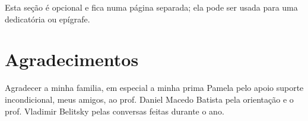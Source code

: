 

\begin{dedicatoria}
    Esta seção é opcional e fica numa página separada; ela pode ser usada para
    uma dedicatória ou epígrafe.
    \end{dedicatoria}
    
    
    \chapter*{Agradecimentos}
    
    Agradecer a minha familia, em especial a minha prima Pamela pelo apoio suporte incondicional, meus amigos, ao
   prof. Daniel Macedo Batista pela orientação e o prof. Vladimir Belitsky pelas conversas feitas durante o ano.
    
    \printResumoAbstract
    
    
    
    \makeatletter
    \if@openright\cleardoublepage\else\clearpage\fi
    \makeatother
    
    

